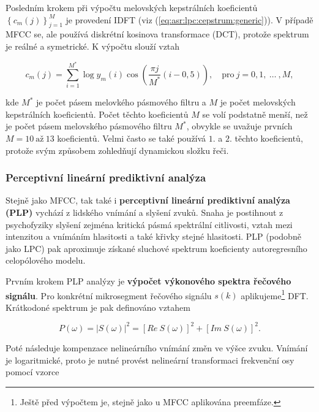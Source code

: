 Posledním krokem při výpočtu melovských kepstrálních koeficientů $\left\{c_m\left(j\right)\right\}_{j=1}^{M}$ je provedení IDFT (viz (\ref{eq:asr:lpc:cepstrum:generic})). V případě MFCC se, ale používá diskrétní kosinova transformace (DCT), protože spektrum je reálné a symetrické. K výpočtu slouží vztah

\begin{equation}
  c_{m}(j) = \sum_{i=1}^{M^{*}} \log y_m(i) \cos\left( \frac{\pi j}{M^{*}}\left(i - 0,5\right) \right),  \quad \text{pro}\ j = 0, 1,\ \dots\ ,M,
  \label{eq:asr:mfcc:coef}
\end{equation}

\noindent kde $M^{*}$ je počet pásem melovkého pásmového filtru a $M$ je počet melovských kepstrálních koeficientů. Počet těchto koeficientů $M$ se volí podstatně menší, než je počet pásem melovského pásmového filtru $M^{*}$, obvykle se uvažuje prvních $M = 10\ \text{až}\ 13$ koeficientů. Velmi často se také používá $1.$ a $2.$ těchto koeficientů, protože svým způsobem zohledňují dynamickou složku řeči.

\subsubsection{Perceptivní lineární prediktivní analýza}

Stejně jako MFCC, tak také i \textbf{perceptivní lineární prediktivní analýza (PLP)} vychází z lidského vnímání a slyšení zvuků. Snaha je postihnout z psychofyziky slyšení zejména kritická pásmá spektrální citlivosti, vztah mezi intenzitou a vnímáním hlasitosti a také křivky stejné hlasitosti. \cite{Psutka2006} PLP (podobně jako LPC) pak aproximuje získané sluchové spektrum koeficienty autoregresního celopólového modelu.

Prvním krokem PLP analýzy je \textbf{výpočet výkonového spektra řečového signálu}. Pro konkrétní mikrosegment řečového signálu $s(k)$ aplikujeme\footnote{Ještě před výpočtem je, stejně jako u MFCC aplikována preemfáze.} DFT. Krátkodoné spektrum je pak definováno vztahem

\begin{equation}
  P\left(\omega\right) = \left| S\left(\omega\right) \right|^{2} = \left[Re\ S\left(\omega\right)\right]^2 + \left[Im\ S\left( \omega \right) \right]^2.
  \label{eq:asr:plp:spectr}
\end{equation}

\noindent Poté následuje kompenzace nelineárního vnímání změn ve výšce zvuku. Vnímání je logaritmické, proto je nutné provést nelineární transformaci frekvenční osy pomocí vzorce

